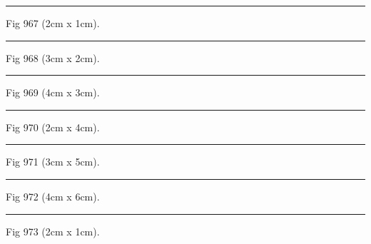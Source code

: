 \documentclass[a4paper,11pt]{article}
\begin{document}
\begin{swarmwrap}%
  \begin{minipage}[t]{2cm}
    \centering
    \rule{\linewidth}{1cm}
    {\footnotesize Fig 967 (2cm x 1cm).}
  \end{minipage}%
\end{swarmwrap}%
\swarmwrapnext
\lipsum[67]%

\begin{swarmwrap}%
  \begin{minipage}[t]{3cm}
    \centering
    \rule{\linewidth}{2cm}
    {\footnotesize Fig 968 (3cm x 2cm).}
  \end{minipage}%
\end{swarmwrap}%
\swarmwrapnext
\lipsum[68]%

\begin{swarmwrap}%
  \begin{minipage}[t]{4cm}
    \centering
    \rule{\linewidth}{3cm}
    {\footnotesize Fig 969 (4cm x 3cm).}
  \end{minipage}%
\end{swarmwrap}%
\swarmwrapnext
\lipsum[69]%

\begin{swarmwrap}%
  \begin{minipage}[t]{2cm}
    \centering
    \rule{\linewidth}{4cm}
    {\footnotesize Fig 970 (2cm x 4cm).}
  \end{minipage}%
\end{swarmwrap}%
\swarmwrapnext
\lipsum[70]%

\begin{swarmwrap}%
  \begin{minipage}[t]{3cm}
    \centering
    \rule{\linewidth}{5cm}
    {\footnotesize Fig 971 (3cm x 5cm).}
  \end{minipage}%
\end{swarmwrap}%
\swarmwrapnext
\lipsum[71]%

\begin{swarmwrap}%
  \begin{minipage}[t]{4cm}
    \centering
    \rule{\linewidth}{6cm}
    {\footnotesize Fig 972 (4cm x 6cm).}
  \end{minipage}%
\end{swarmwrap}%
\swarmwrapnext
\lipsum[72]%

\begin{swarmwrap}%
  \begin{minipage}[t]{2cm}
    \centering
    \rule{\linewidth}{1cm}
    {\footnotesize Fig 973 (2cm x 1cm).}
  \end{minipage}%
\end{swarmwrap}%
\swarmwrapnext
\lipsum[73]%
\end{document}
